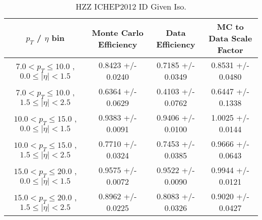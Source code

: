  \begin{table}[!ht]
 \begin{center} 
 \begin{tabular}{|c|c|c|c|}
 \hline
 $p_{T}$ / $\eta$ bin    &  Monte Carlo Efficiency    &  Data Efficiency   &  MC to Data Scale Factor \\   \hline           
$  7.0 < p_{T} \le  10.0$ , $  0.0  \le |\eta| <   1.5$   &       0.8423 +/- 0.0240   &       0.7185 +/- 0.0349   &       0.8531 +/- 0.0480   \\   
\hline
$  7.0 < p_{T} \le  10.0$ , $  1.5  \le |\eta| <   2.5$   &       0.6364 +/- 0.0629   &       0.4103 +/- 0.0762   &       0.6447 +/- 0.1338   \\   
\hline
$ 10.0 < p_{T} \le  15.0$ , $  0.0  \le |\eta| <   1.5$   &       0.9383 +/- 0.0091   &       0.9406 +/- 0.0100   &       1.0025 +/- 0.0144   \\   
\hline
$ 10.0 < p_{T} \le  15.0$ , $  1.5  \le |\eta| <   2.5$   &       0.7710 +/- 0.0324   &       0.7453 +/- 0.0385   &       0.9666 +/- 0.0643   \\   
\hline
$ 15.0 < p_{T} \le  20.0$ , $  0.0  \le |\eta| <   1.5$   &       0.9575 +/- 0.0072   &       0.9522 +/- 0.0090   &       0.9944 +/- 0.0121   \\   
\hline
$ 15.0 < p_{T} \le  20.0$ , $  1.5  \le |\eta| <   2.5$   &       0.8962 +/- 0.0225   &       0.8083 +/- 0.0326   &       0.9020 +/- 0.0427   \\   
\hline
\end{tabular}
\caption{HZZ ICHEP2012 ID Given Iso.}
\label{tab:eff_ele_offline}
\end{center}
\end{table}




